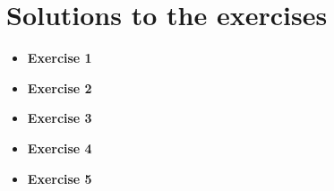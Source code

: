 \section{Solutions to the exercises}

\begin{itemize}
\item \textbf{Exercise 1}

\item \textbf{Exercise 2}

\item \textbf{Exercise 3}

\item \textbf{Exercise 4}


\item \textbf{Exercise 5}

\end{itemize}